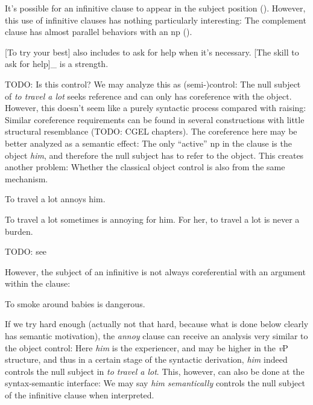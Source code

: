 \documentclass[UTF8, a4paper, oneside, scheme=plain, 12pt]{ctexbook}
\newcommand*{\citepage}[1]{p.~{#1}}
\newcommand{\form}[1]{\emph{#1}}
\newcommand{\vP}{\textit{v}P}
\begin{document}
It's possible for an infinitive clause to appear in the subject position
().
However, this use of infinitive clauses 
has nothing particularly interesting:
The complement clause has almost parallel behaviors with an \acs{np} 
().

\begin{exe}
    \ex\label{ex:complement.infinitive.1} 
    [To try your best] also includes to ask for help when it's necessary.
    \ex\label{ex:complement.infinitive.1p} [The skill to ask for help]_{}
    is a strength.
\end{exe}

TODO: Is this control?
We may analyze this as (semi-)control:
The null subject of \form{to travel a lot} 
seeks reference and can only has coreference with the object.
However, this doesn't seem like a purely syntactic process
compared with raising:
Similar coreference requirements can be found in 
several constructions with little structural resemblance
(TODO: CGEL chapters).
The coreference here may be better analyzed as a semantic effect:
The only ``active'' \acs{np} in the clause is the object \form{him},
and therefore the null subject has to refer to the object.
This creates another problem: 
Whether the classical object control is also from the same mechanism.

\begin{exe}
    \ex To travel a lot annoys him.
\end{exe}
\begin{exe}
    \ex To travel a lot sometimes is annoying for him.
    \ex For her, to travel a lot is never a burden.
\end{exe}

TODO: see \citet[\citepage{1269}]{cgel}

However, the subject of an infinitive is not always coreferential with an argument within the clause:
\begin{exe}
    \ex To smoke around babies is dangerous.
\end{exe} 

If we try hard enough
(actually not that hard, because what is done below clearly has semantic motivation), 
the \form{annoy} clause can receive an analysis very similar to the object control:
Here \form{him} is the experiencer, 
and may be higher in the \vP{} structure, 
and thus in a certain stage of the syntactic derivation,
\form{him} indeed controls the null subject in \form{to travel a lot}.
This, however, can also be done at the syntax-semantic interface: 
We may say \form{him} \emph{semantically} controls 
the null subject of the infinitive clause
when interpreted.
\end{document}
